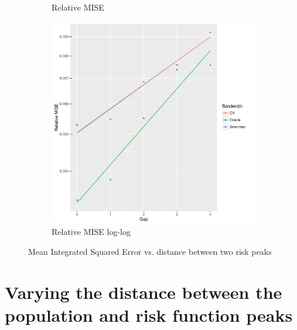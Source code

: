 \begin{figure}[htbp]
\begin{subfigure}[b]{0.3\textwidth}
    \caption{Relative MISE}
    \end{subfigure}
    \begin{subfigure}[b]{0.3\textwidth}
    \includegraphics[width=\textwidth]{results/by_two_peaks/RMISE-vs-risk-peak-gap-log-log}
    \caption{Relative MISE log-log}
    \end{subfigure}
    \caption[MISE: by risk decay]{Mean Integrated Squared Error vs. distance between two risk peaks}
    \label{fig:ise:p1.4_100_G}
\end{figure}

\section{Varying the distance between the population and risk function peaks}
\label{sec:ise:p1.4_Gap_risk}

